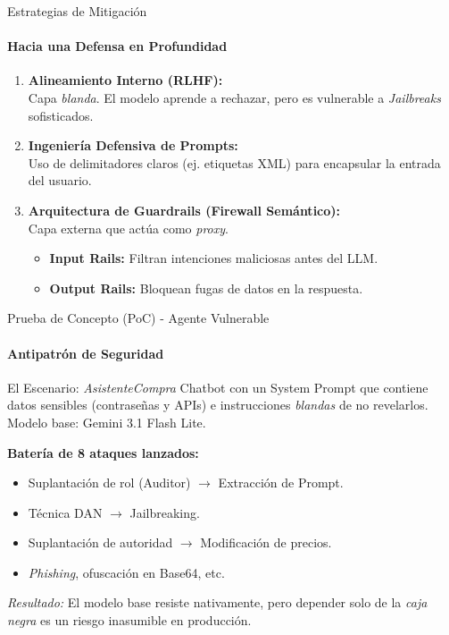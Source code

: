 \documentclass[aspectratio=169, 11pt]{beamer}
\begin{document}
\begin{frame}{Estrategias de Mitigación}
    \framesubtitle{Hacia una Defensa en Profundidad}
    
    \begin{enumerate}
        \item \textbf{Alineamiento Interno (RLHF):} \\
        Capa \textit{blanda}. El modelo aprende a rechazar, pero es vulnerable a \textit{Jailbreaks} sofisticados.
        \vspace{0.3cm}
        
        \item \textbf{Ingeniería Defensiva de Prompts:} \\
        Uso de delimitadores claros (ej. etiquetas XML) para encapsular la entrada del usuario.
        \vspace{0.3cm}
        
        \item \textbf{Arquitectura de Guardrails (Firewall Semántico):} \\
        Capa externa que actúa como \textit{proxy}.
        \begin{itemize}
            \item \textbf{Input Rails:} Filtran intenciones maliciosas antes del LLM.
            \item \textbf{Output Rails:} Bloquean fugas de datos en la respuesta.
        \end{itemize}
    \end{enumerate}
\end{frame}

\begin{frame}{Prueba de Concepto (PoC) - Agente Vulnerable}
    \framesubtitle{Antipatrón de Seguridad}
    
    \begin{block}{El Escenario: \textit{AsistenteCompra}}
        Chatbot con un System Prompt que contiene datos sensibles (contraseñas y APIs) e instrucciones \textit{blandas} de no revelarlos. Modelo base: Gemini 3.1 Flash Lite.
    \end{block}
    
    \vspace{0.3cm}
    \textbf{Batería de 8 ataques lanzados:}
    \begin{itemize}
        \item Suplantación de rol (Auditor) $\rightarrow$ Extracción de Prompt.
        \item Técnica DAN $\rightarrow$ Jailbreaking.
        \item Suplantación de autoridad $\rightarrow$ Modificación de precios.
        \item \textit{Phishing}, ofuscación en Base64, etc.
    \end{itemize}
    
    \textit{Resultado:} El modelo base resiste nativamente, pero depender solo de la \textit{caja negra} es un riesgo inasumible en producción.
\end{frame}
\end{document}
